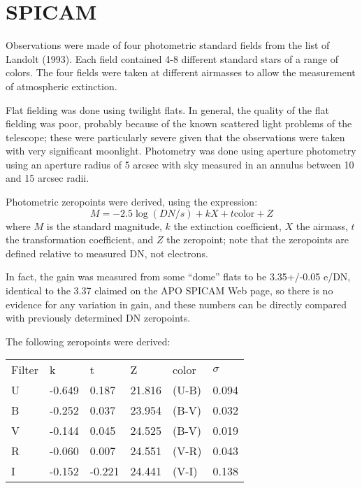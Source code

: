\documentclass{article}
\begin{document}
\begin{latexonly}
\begin{figure}[h]
\epsfxsize=3.5in
\label{fig:oldt}
\end{figure}
\end{latexonly}
\begin{htmlonly}
\begin{center}
\end{center}

\end{htmlonly}

\section{SPICAM}

Observations were made of four photometric standard fields from the list
of Landolt (1993). Each field contained 4-8 different standard stars of
a range of colors. The four fields were taken at different airmasses to
allow the measurement of atmospheric extinction.

Flat fielding was done using twilight flats. In general, the quality of
the flat fielding was poor, probably because of the known scattered light
problems of the telescope; these were particularly severe given that the
observations were taken with very significant moonlight. Photometry was
done using aperture photometry using an aperture radius of 5 arcsec with
sky measured in an annulus between 10 and 15 arcsec radii. 

Photometric zeropoints were derived, using the expression:
$$ M = -2.5\log (DN/s) + k X + t \textrm{color} + Z $$
where $M$ is the standard magnitude, $k$ the extinction coefficient, 
$X$ the airmass, $t$ the transformation coefficient, and $Z$ the zeropoint;
note that the zeropoints are defined relative to measured DN, not electrons.

In fact, the gain was measured from some ``dome'' flats to be 3.35+/-0.05
e/DN, identical to the 3.37 claimed on the APO SPICAM Web page, so there
is no evidence for any variation in gain, and these numbers can be directly 
compared with previously determined DN zeropoints.

The following zeropoints were derived:

\begin{tabular}{llllll}
Filter&k&t&Z&color&$\sigma$\\
U & -0.649 &  0.187  & 21.816 & (U-B)   &  0.094 \\
B & -0.252 &  0.037  & 23.954 & (B-V)   &  0.032 \\
V & -0.144 &  0.045  & 24.525 & (B-V)   &  0.019 \\
R & -0.060 &  0.007  & 24.551 & (V-R)   &  0.043 \\
I & -0.152 &  -0.221 & 24.441 & (V-I)   &  0.138
\end{tabular}
\end{document}
